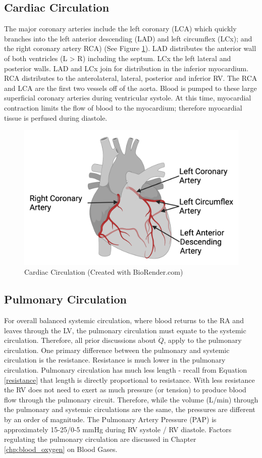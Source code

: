 \subsection{Cardiac Circulation}

The major coronary arteries include the left coronary (LCA) which quickly branches into the left anterior descending (LAD) and left circumflex (LCx); and the right coronary artery RCA) (See Figure \ref{fig:Cardiac_Circulation}). LAD distributes the anterior wall of both ventricles (L > R) including the septum. LCx the left lateral and posterior walls. LAD and LCx join for distribution in the inferior myocardium. RCA distributes to the anterolateral, lateral, posterior and inferior RV. The RCA and LCA are the first two vessels off of the aorta. Blood is pumped to these large superficial coronary arteries during ventricular systole. At this time, myocardial contraction limits the flow of blood to the myocardium; therefore myocardial tissue is perfused during diastole.

\begin{figure}[!h]
    \centering
    \includegraphics[width=0.5\linewidth]{./figure/Cardiac_Circulation.png}
    \caption{Cardiac Circulation \footnotesize{(Created with BioRender.com)}}
    \label{fig:Cardiac_Circulation}
\end{figure}

\subsection{Pulmonary Circulation}
For overall balanced systemic circulation, where blood returns to the RA and leaves through the LV, the pulmonary circulation must equate to the systemic circulation. Therefore, all prior discussions about $\dot{Q}$, apply to the pulmonary circulation. One primary difference between the pulmonary and systemic circulation is the resistance. Resistance is much lower in the pulmonary circulation. Pulmonary circulation has much less length - recall from Equation \ref{resistance} that length is directly proportional to resistance. With less resistance the RV does not need to exert as much pressure (or tension) to produce blood flow through the pulmonary circuit. Therefore, while the volume (L/min) through the pulmonary and systemic circulations are the same, the pressures are different by an order of magnitude. The Pulmonary Artery Pressure (PAP) is approximately 15-25/0-5 mmHg during RV systole / RV diastole. Factors regulating the pulmonary circulation are discussed in Chapter \ref{chp:blood_oxygen} on Blood Gases.

